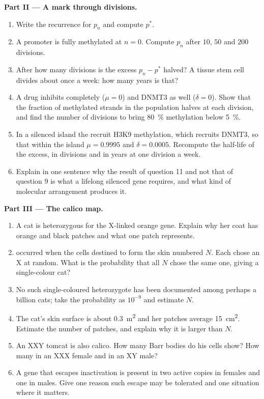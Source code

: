 \begin{problem}
\medskip
\noindent\textbf{Part II --- A mark through divisions.}
\begin{enumerate}[resume]
  \item Write the recurrence for $p_{n}$ and compute $p^{*}$.
  \item A promoter  is fully methylated at $n = 0$. Compute $p_{n}$
        after $10$, $50$ and $200$ divisions.
  \item After how many divisions is the excess $p_{n} - p^{*}$ halved?
        A tissue stem cell divides about once a week: how many years is
        that?
  \item A drug inhibits  completely ($\mu = 0$) and DNMT3 as well
        ($\delta = 0$). Show that the fraction of methylated strands in
        the population halves at each division, and find the number of
        divisions to bring \qty{80}{\%} methylation below \qty{5}{\%}.
  \item In a silenced island the   recruit H3K9
        methylation, which recruits DNMT3, so that within the island
        $\mu = 0.9995$ and $\delta = 0.0005$. Recompute the half-life
        of the excess, in divisions and in years at one division a
        week.
  \item Explain in one sentence why the result of question 11 and not
        that of question 9 is what a lifelong silenced gene requires,
        and what kind of molecular arrangement produces it.
\end{enumerate}

\medskip
\noindent\textbf{Part III --- The calico map.}
\begin{enumerate}[resume]
  \item A cat is heterozygous for the X-linked orange gene. Explain
        why her coat has orange and black patches and what one patch
        represents.
  \item {} occurred when the cells destined to form the
        skin numbered $N$. Each chose an X at random. What is the
        probability that all $N$ chose the same one, giving a
        single-colour cat?
  \item No such single-coloured heterozygote has been documented
        among perhaps a billion cats; take the probability as
        $10^{-9}$ and estimate $N$.
  \item The cat's skin surface is about \qty{0.3}{m^2} and her patches
        average \qty{15}{cm^2}. Estimate the number of patches, and
        explain why it is larger than $N$.
  \item An XXY tomcat is also calico. How many Barr bodies do his
        cells show? How many in an XXX female and in an XY male?
  \item A gene that escapes inactivation is present in two active
        copies in females and one in males. Give one reason such
        escape may be tolerated and one situation where it matters.
\end{enumerate}


\end{problem}
